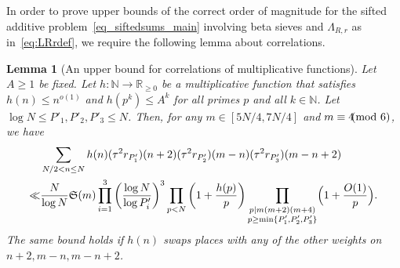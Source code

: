\documentclass[12pt]{amsart}
\newtheorem{lemma}[theorem]{Lemma}
\theoremstyle{definition}
\theoremstyle{remark}
\numberwithin{equation}{section}
\newcommand{\1}{\mathbf{1}}
\let\oldpmod\pmod
\renewcommand{\pmod}[1]{\hspace{-0.12cm}\oldpmod {#1}}
\begin{document}
In order to prove upper bounds of the correct order of magnitude for the sifted additive problem~\eqref{eq_siftedsums_main} involving beta sieves and $\Lambda_{R,r}$ as in~\eqref{eq:LRrdef}, we require the following lemma about correlations.

\begin{lemma}[An upper bound for correlations of multiplicative functions]\label{le:henriot}
    Let $A\geq 1$ be fixed. Let $h:\mathbb{N}\to \mathbb{R}_{\geq 0}$ be a multiplicative function that satisfies $h(n)\leq n^{o(1)}$ and $h(p^k)\leq A^k$ for all primes $p$ and all $k\in \mathbb{N}$. Let $\log N\leq P'_1,P'_2,P'_3 \leq N$. Then, for any $m\in [5N/4,7N/4]$ and $m \equiv 4\pmod 6$, we have
	\begin{align}
	\label{eq:henriotapp}	&\sum_{N/2< n\leq N}h(n)(\tau^2r_{P'_1})(n+2)(\tau^2r_{P'_2})(m-n)(\tau^2r_{P'_3})(m-n+2)\\
		\ll& \frac{N}{\log N}\mathfrak{S}(m) \prod_{i=1}^3 \nonumber \left(\frac{\log N}{\log P'_i}\right)^{3} \prod_{p<N}\left(1+\frac{h(p)}{p}\right)\prod_{\substack{p\mid m (m+2)(m+4)\\ p\geq \min\{P'_1,P'_2,P'_3\}}}\Bigl(1+\frac{O(1)}{p}\Bigr).
	\end{align}
    The same bound holds if $h(n)$ swaps places with any of the other weights on $n+2,m-n,m-n+2$.
\end{lemma}
\end{document}
